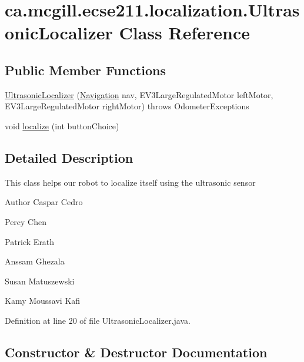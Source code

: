 \hypertarget{classca_1_1mcgill_1_1ecse211_1_1localization_1_1_ultrasonic_localizer}{}\section{ca.\+mcgill.\+ecse211.\+localization.\+Ultrasonic\+Localizer Class Reference}
\label{classca_1_1mcgill_1_1ecse211_1_1localization_1_1_ultrasonic_localizer}
\subsection*{Public Member Functions}
\begin{DoxyCompactItemize}
\item 
\hyperlink{classca_1_1mcgill_1_1ecse211_1_1localization_1_1_ultrasonic_localizer_a3603202cdb5035c4e4164933b0aebeec}{Ultrasonic\+Localizer} (\hyperlink{classca_1_1mcgill_1_1ecse211_1_1project_1_1_navigation}{Navigation} nav, E\+V3\+Large\+Regulated\+Motor left\+Motor, E\+V3\+Large\+Regulated\+Motor right\+Motor)  throws Odometer\+Exceptions 
\item 
void \hyperlink{classca_1_1mcgill_1_1ecse211_1_1localization_1_1_ultrasonic_localizer_ab78196997d7409aec0c35603686989ad}{localize} (int button\+Choice)
\end{DoxyCompactItemize}


\subsection{Detailed Description}
This class helps our robot to localize itself using the ultrasonic sensor

\begin{DoxyAuthor}{Author}
Caspar Cedro 

Percy Chen 

Patrick Erath 

Anssam Ghezala 

Susan Matuszewski 

Kamy Moussavi Kafi 
\end{DoxyAuthor}


Definition at line 20 of file Ultrasonic\+Localizer.\+java.



\subsection{Constructor \& Destructor Documentation}
\mbox{\label{classca_1_1mcgill_1_1ecse211_1_1localization_1_1_ultrasonic_localizer_a3603202cdb5035c4e4164933b0aebeec}} 

